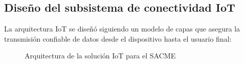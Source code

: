 \documentclass{report}          %
\newcommand{\shortname}     {SACME}
\begin{document}
            \subsection{Diseño del subsistema de conectividad IoT}
                La arquitectura IoT se diseñó siguiendo un modelo de capas que asegura la transmisión confiable de datos desde el dispositivo hasta el usuario final:

                \begin{figure}[H]
                    \centering
                    \caption{Arquitectura de la solución IoT para el \shortname}
                \end{figure}
                
\end{document}
